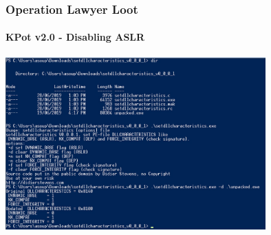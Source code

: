\documentclass[aspectratio=169]{beamer}
\begin{document}
{
\begin{frame}
  \frametitle{Operation Lawyer Loot}
  \framesubtitle{KPot v2.0 - Disabling ASLR}
  \begin{center}
    \includegraphics[width=10cm]{kpot-disable-aslr}
  \end{center}
\end{frame}
}
\end{document}
